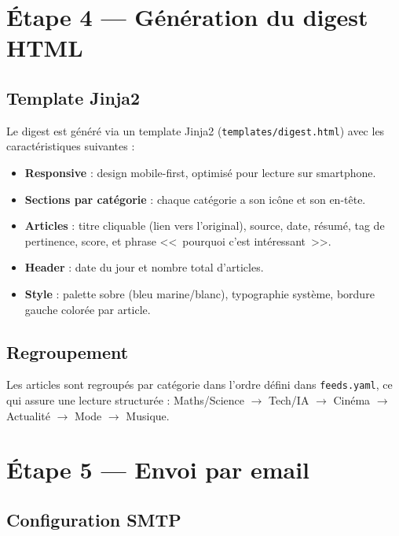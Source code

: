 \documentclass[11pt, a4paper]{article}
\begin{document}
\section{Étape 4 --- Génération du digest HTML}

\subsection{Template Jinja2}

Le digest est généré via un template Jinja2 (\texttt{templates/digest.html}) avec les caractéristiques suivantes :

\begin{itemize}
    \item \textbf{Responsive} : design mobile-first, optimisé pour lecture sur smartphone.
    \item \textbf{Sections par catégorie} : chaque catégorie a son icône et son en-tête.
    \item \textbf{Articles} : titre cliquable (lien vers l'original), source, date, résumé, tag de pertinence, score, et phrase <<~pourquoi c'est intéressant~>>.
    \item \textbf{Header} : date du jour et nombre total d'articles.
    \item \textbf{Style} : palette sobre (bleu marine/blanc), typographie système, bordure gauche colorée par article.
\end{itemize}

\subsection{Regroupement}

Les articles sont regroupés par catégorie dans l'ordre défini dans \texttt{feeds.yaml}, ce qui assure une lecture structurée : Maths/Science $\to$ Tech/IA $\to$ Cinéma $\to$ Actualité $\to$ Mode $\to$ Musique.

\section{Étape 5 --- Envoi par email}

\subsection{Configuration SMTP}
\end{document}
